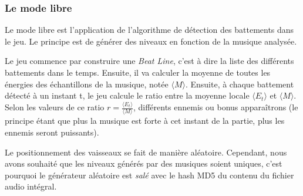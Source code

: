 \subsubsection{Le mode libre}

\par Le mode libre est l'application de l'algorithme de détection des battements dans le jeu. Le principe est de générer des niveaux en fonction de la musique analysée.
\par Le jeu commence par construire une \emph{Beat Line}, c'est à dire la liste des différents battements dans le temps. Ensuite, il va calculer la moyenne de toutes les énergies des échantillons de la musique, notée $\langle M \rangle$. Ensuite, à chaque battement détecté à un instant t, le jeu calcule le ratio entre la moyenne locale $\langle E_t \rangle$ et $\langle M \rangle$. Selon les valeurs de ce ratio $r = \frac{\langle E_t \rangle}{\langle M \rangle}$, différents ennemis ou bonus apparaîtrons (le principe étant que plus la musique est forte à cet instant de la partie, plus les ennemis seront puissants).
\par Le positionnement des vaisseaux se fait de manière aléatoire. Cependant, nous avons souhaité que les niveaux générés par des musiques soient uniques, c'est pourquoi le générateur aléatoire est \emph{salé} avec le hash MD5 du contenu du fichier audio intégral.


